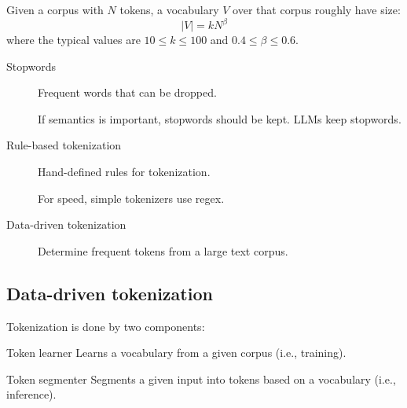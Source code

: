 \begin{remark}
    Given a corpus with $N$ tokens, a vocabulary $V$ over that corpus roughly have size:
    \[ \left\vert V \right\vert = kN^\beta \]
    where the typical values are $10 \leq k \leq 100$ and $0.4 \leq \beta \leq 0.6$.
\end{remark}

\begin{description}
    \item[Stopwords] 
        Frequent words that can be dropped.

        \begin{remark}
            If semantics is important, stopwords should be kept. LLMs keep stopwords.
        \end{remark}
\end{description}

\begin{description}
    \item[Rule-based tokenization]  
        Hand-defined rules for tokenization.
        \begin{remark}
            For speed, simple tokenizers use regex.
        \end{remark}

    \item[Data-driven tokenization] 
        Determine frequent tokens from a large text corpus.
\end{description}


\subsection{Data-driven tokenization}

Tokenization is done by two components:
\begin{descriptionlist}
    \item[Token learner] 
        Learns a vocabulary from a given corpus (i.e., training).

    \item[Token segmenter] 
        Segments a given input into tokens based on a vocabulary (i.e., inference).
\end{descriptionlist}


